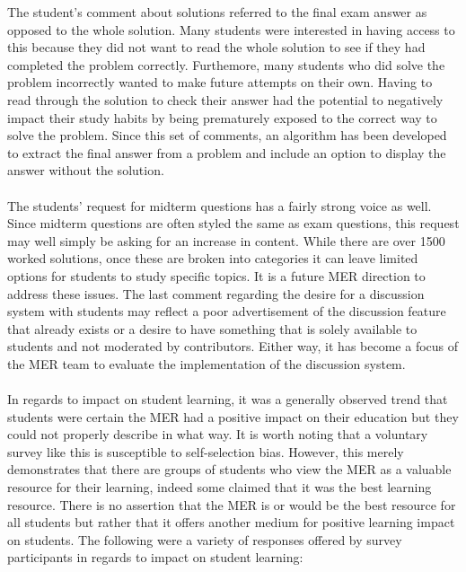 \documentclass{primus}
\begin{document}
\noindent{}The student’s comment about solutions referred to the final exam answer as opposed to the whole solution. Many students were interested in having access to this because they did not want to read the whole solution to see if they had completed the problem correctly. Furthemore, many students who did solve the problem incorrectly wanted to make future attempts on their own. Having to read through the solution to check their answer had the potential to negatively impact their study habits by being prematurely exposed to the correct way to solve the problem. Since this set of comments, an algorithm has been developed to extract the final answer from a problem and include an option to display the answer without the solution.
\\\\
\noindent{}The students’ request for midterm questions has a fairly strong voice as well. Since midterm questions are often styled the same as exam questions, this request may well simply be asking for an increase in content. While there are over 1500 worked solutions, once these are broken into categories it can leave limited options for students to study specific topics. It is a future MER direction to address these issues. The last comment regarding the desire for a discussion system with students may reflect a poor advertisement of the discussion feature that already exists or a desire to have something that is solely available to students and not moderated by contributors. Either way, it has become a focus of the MER team to evaluate the implementation of the discussion system.
\\\\
\noindent{}In regards to impact on student learning, it was a generally observed trend that students were certain the MER had a positive impact on their education but they could not properly describe in what way. It is worth noting that a voluntary survey like this is susceptible to self-selection bias. However, this merely demonstrates that there are groups of students who view the MER as a valuable resource for their learning, indeed some claimed that it was the best learning resource. There is no assertion that the MER is or would be the best resource for all students but rather that it offers another medium for positive learning impact on students. The following were a variety of responses offered by survey participants in regards to impact on student learning:
\end{document}
